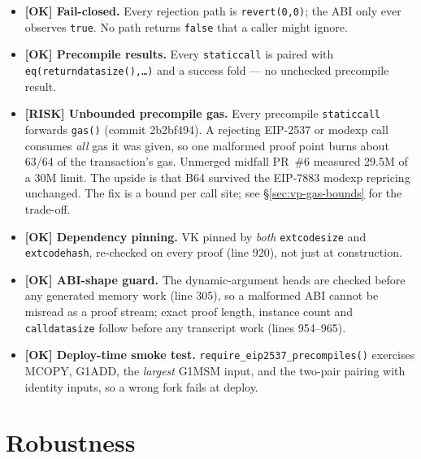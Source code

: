 \begin{itemize}
  \item \textcolor{tracegreen}{\textbf{[OK] Fail-closed.}} Every
        rejection path is \texttt{revert(0,0)}; the ABI only ever
        observes \texttt{true}. No path returns \texttt{false} that a
        caller might ignore.
  \item \textcolor{tracegreen}{\textbf{[OK] Precompile results.}}
        Every \texttt{staticcall} is paired with
        \texttt{eq(returndatasize(),\ldots)} and a success fold --- no
        unchecked precompile result.
  \item \textcolor{rustorange}{\textbf{[RISK] Unbounded precompile gas.}}
         Every precompile \texttt{staticcall} forwards
        \texttt{gas()} (commit 2b2bf494). A rejecting EIP-2537 or modexp
        call consumes \emph{all} gas it was given, so one malformed proof
        point burns about 63/64 of the transaction's gas. Unmerged midfall
        PR~\#6 measured 29.5M of a 30M limit. The upside is that B64
        survived the EIP-7883 modexp repricing unchanged. The fix is a
        bound per call site; see \S\ref{sec:vp-gas-bounds} for the
        trade-off.
  \item \textcolor{tracegreen}{\textbf{[OK] Dependency pinning.}} VK
        pinned by \emph{both} \texttt{extcodesize} and
        \texttt{extcodehash}, re-checked on every proof (line 920), not
        just at construction.
  \item \textcolor{tracegreen}{\textbf{[OK] ABI-shape guard.}} The
        dynamic-argument heads are checked before any generated memory
        work (line 305), so a malformed ABI cannot be misread as a proof
        stream; exact proof length, instance count and
        \texttt{calldatasize} follow before any transcript work
        (lines 954--965).
  \item \textcolor{tracegreen}{\textbf{[OK] Deploy-time smoke test.}}
        \texttt{require\_\allowbreak{}eip2537\_\allowbreak{}precompiles()} exercises MCOPY, G1ADD,
        the \emph{largest} G1MSM input, and the two-pair pairing with
        identity inputs, so a wrong fork fails at deploy.
\end{itemize}

\section{Robustness}
\label{sec:pr-robust}

